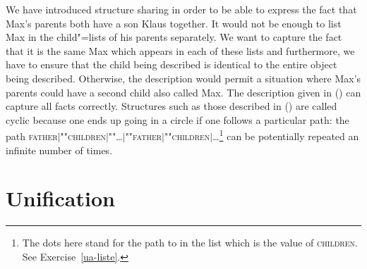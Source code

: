 We have introduced structure sharing in order to be able to express
the fact that Max's parents both have a son Klaus together. It would not be enough to list Max in
the child"=lists of his parents separately. We want to capture the fact that it is the same Max which
appears in each of these lists and furthermore, we have to ensure that the child being described is
identical to the entire object being described. Otherwise, the description would permit a situation where Max's
parents could have a second child also called Max.  The description given in
() can capture all facts correctly.
\ea
\label{bsp-avm-zyklen}
 
\z
Structures such as those described in () are called cyclic because one ends up going in a circle if one follows a particular path: \eg the path 
\textsc{father$|$""children$|$""\ldots$|$""father$|$""children$|$\ldots}\footnote{
	The dots here stand for the path to  in the list which is the value of \textsc{children}. See Exercise~\ref{ua-liste}.%
}
can be potentially repeated an infinite number of times.

\section{Unification}
\label{sec-unification}


